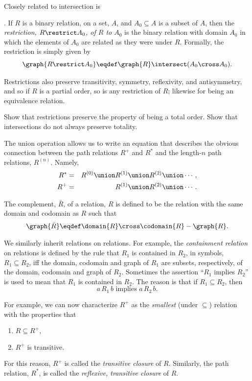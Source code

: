 Closely related to intersection is .  If $R$ is a binary relation, on a set, $A$,
and $A_0 \subseteq A$ is a subset of $A$, then the \emph{restriction, $R
\restrict A_0$, of $R$ to $A_0$} is the binary relation with domain $A_0$
in which the elements of $A_0$ are related as they were under $R$.
Formally, the restriction is simply given by
\[
\graph{R \restrict A_0} \eqdef \graph{R} \intersect (A_0 \cross A_0).
\]

Restrictions also preserve transitivity, symmetry, reflexivity, and
antisymmetry, and so if $R$ is a partial order, so is any restriction of
$R$; likewise for being an equivalence relation.

\begin{problem}
Show that restrictions preserve the property of being a total order.  Show
that intersections do not always preserve totality.
\end{problem}

The union operation allows us to write an equation that describes the
obvious connection between the path relations $R^+$ and $R^*$ and the
length-$n$ path relations, $R^{(n)}$.  Namely,
\begin{eqnarray}
R^* &=& R^{(0)} \union  R^{(1)} \union R^{(2)} \union \cdots,\label{R*u}\\
R^+ &=&                 R^{(1)} \union R^{(2)} \union \cdots.\label{R+u}
\end{eqnarray}

The complement, $\bar{R}$, of a relation, $R$ is defined to be the
relation with the same domain and codomain as $R$ such that
\[
\graph{\bar{R}} \eqdef \domain{R}\cross\codomain{R} - \graph{R}.
\]

We similarly inherit relations on relations.  For example, the
\emph{containment relation} on relations is defined by the rule that $R_1$
is contained in $R_2$, in symbols, $R_1 \subseteq R_2$, iff the domain,
codomain and graph of $R_1$ are subsets, respectively, of the domain,
codomain and graph of $R_2$.  Sometimes the assertion ``$R_1$ implies
$R_2$'' is used to mean that $R_1$ is contained in $R_2$.  The reason is
that if $R_1 \subseteq R_2$, then
\[
a\, R_1\, b \text{  implies  } a\, R_2\, b.
\]

For example, we can now characterize $R^+$ as the \emph{smallest} (under
$\subseteq$) relation with the properties that
\begin{enumerate}
\item $R \subseteq R^+$,
\item $R^+$ is transitive.
\end{enumerate}
For this reason, $R^+$ is called the \emph{transitive closure} of $R$.
Similarly, the path relation, $R^*$, is called the \emph{reflexive,
transitive closure} of $R$.

